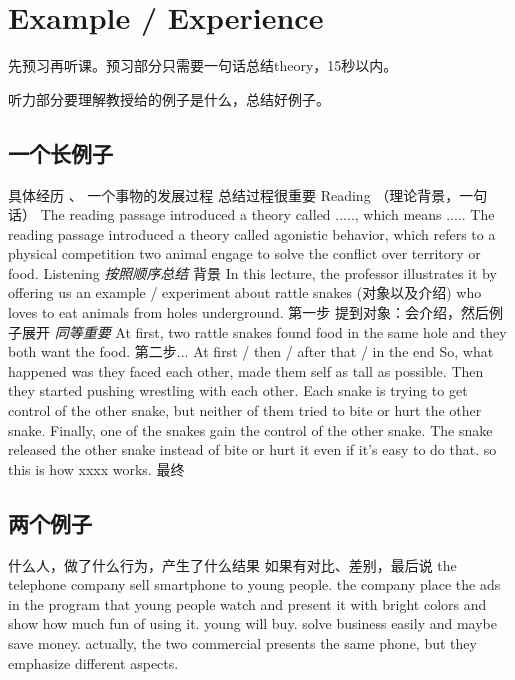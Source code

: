 \documentclass{ctexart}
\begin{document}
\section{Example / Experience}
先预习再听课。预习部分只需要一句话总结theory，15秒以内。

听力部分要理解教授给的例子是什么，总结好例子。
\subsection{一个长例子}
\begin{outline}
    \1 具体经历 、 一个事物的发展过程
        \2 总结过程很重要
    \1 Reading （理论背景，一句话）
        \2 The reading passage introduced a theory called ....., which means .....
        \2 The reading passage introduced a theory called agonistic behavior, which refers to a physical competition two animal engage to solve the conflict over territory or food.
    \1 Listening
        \2 \emph{按照顺序总结}
        \2 背景
            \3 In this lecture, the professor illustrates it by offering us an example / experiment about rattle snakes (对象以及介绍) who loves to eat animals from holes underground.
        \2 第一步
            \3 提到对象：会介绍，然后例子展开
            \3 \emph{同等重要}
            \3 At first, two rattle snakes found food in the same hole and they both want the food.
        \2 第二步...
            \3 At first / then / after that / in the end
            \3 So, what happened was they faced each other, made them self as tall as possible.
            \3 Then they started pushing wrestling with each other.
            \3 Each snake is trying to get control of the other snake, but neither of them tried to bite or hurt the other snake.
            \3 Finally, one of the snakes gain the control of the other snake. The snake released the other snake instead of bite or hurt it even if it's easy to do that.
            \3 so this is how xxxx  works.
        \2 最终
\end{outline}
\subsection{两个例子}

\begin{outline}
    \1 什么人，做了什么行为，产生了什么结果
    \1 如果有对比、差别，最后说
        \2 the telephone company sell smartphone to young people.
        \2 the company place the ads in the program that young people watch and present it with bright colors and show how much fun of using it.
        \2 young will buy.
        \2 solve business easily and maybe save money.
        \2 actually, the two commercial presents the same phone, but they emphasize different aspects.
\end{outline}
\end{document}
